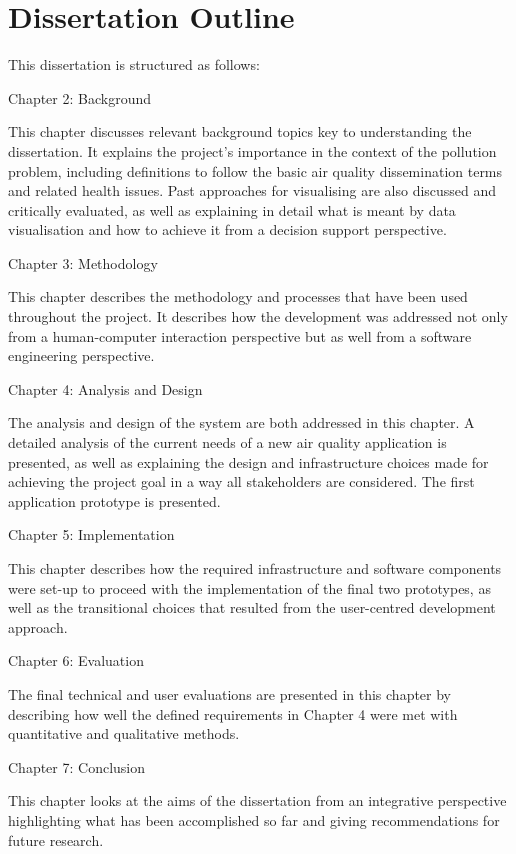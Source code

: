 \section{Dissertation Outline}
This dissertation is structured as follows: 
 
\bigskip
 Chapter 2: Background
\bigskip

This chapter discusses relevant background topics key to understanding the dissertation. It explains the project's importance in the context of the pollution problem, including definitions to follow the basic air quality dissemination terms and related health issues. Past approaches for visualising are also discussed and critically evaluated, as well as explaining in detail what is meant by data visualisation and how to achieve it from a decision support perspective.
 
\bigskip
 Chapter 3: Methodology
\bigskip
  
This chapter describes the methodology and processes that have been used throughout the project. It describes how the development was addressed not only from a human-computer interaction perspective but as well from a software engineering perspective. 
  
\bigskip  
 Chapter 4: Analysis and Design
\bigskip

The analysis and design of the system are  both addressed in this chapter. A detailed analysis of the current needs of a new air quality application is presented, as well as explaining the design and infrastructure choices made for achieving the project goal in a way all stakeholders are considered. The first application prototype is presented.
 
\bigskip
Chapter 5: Implementation
\bigskip

This chapter describes how the required infrastructure and software components were set-up to proceed with the implementation of the final two prototypes, as well as the transitional choices that resulted from the user-centred development approach.

\bigskip
 Chapter 6: Evaluation
\bigskip

The final technical and user evaluations are presented in this chapter by describing how well the defined requirements in Chapter 4 were met with quantitative and qualitative methods.

\bigskip
 Chapter 7: Conclusion
\bigskip

This chapter looks at the aims of the dissertation from an integrative perspective highlighting what has been accomplished so far and giving recommendations for future research.